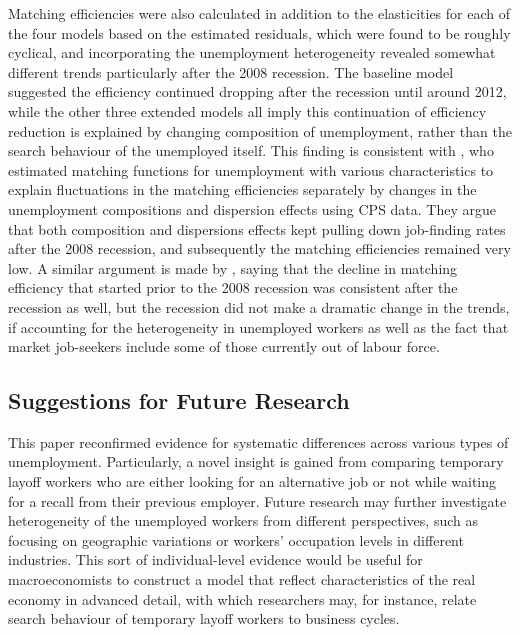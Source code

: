 \documentclass[a4paper, 11pt, tikz]{article}
\begin{document}
Matching efficiencies were also calculated in addition to the elasticities for each of the four models based on the estimated residuals, which were found to be roughly cyclical, and incorporating the unemployment heterogeneity revealed somewhat different trends particularly after the 2008 recession.
The baseline model suggested the efficiency continued dropping after the recession until around 2012, while the other three extended models all imply this continuation of efficiency reduction is explained by changing composition of unemployment, rather than the search behaviour of the unemployed itself.
This finding is consistent with \cite{barnichon2015labor}, who estimated matching functions for unemployment with various characteristics to explain fluctuations in the matching efficiencies separately by changes in the unemployment compositions and dispersion effects using CPS data.
They argue that both composition and dispersions effects kept pulling down job-finding rates after the 2008 recession, and subsequently the matching efficiencies remained very low.
A similar argument is made by \cite{hall2018measuring}, saying that the decline in matching efficiency that started prior to the 2008 recession was consistent after the recession as well, but the recession did not make a dramatic change in the trends, if accounting for the heterogeneity in unemployed workers as well as the fact that market job-seekers include some of those currently out of labour force.

\subsection{Suggestions for Future Research}
This paper reconfirmed evidence for systematic differences across various types of unemployment.
Particularly, a novel insight is gained from comparing temporary layoff workers who are either looking for an alternative job or not while waiting for a recall from their previous employer.
Future research may further investigate heterogeneity of the unemployed workers from different perspectives, such as focusing on geographic variations or workers' occupation levels in different industries.
This sort of individual-level evidence would be useful for macroeconomists to construct a model that reflect characteristics of the real economy in advanced detail, with which researchers may, for instance, relate search behaviour of temporary layoff workers to business cycles.
\end{document}
